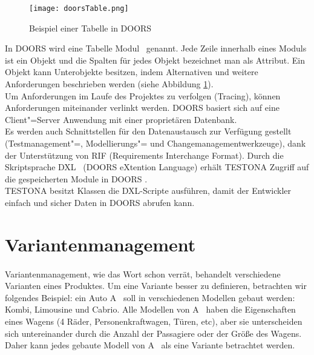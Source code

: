 \begin{figure}[h]
  \begin{center}
    \texttt{[image: doorsTable.png]}
  		  \caption{Beispiel einer Tabelle in DOORS}
     \label{doors.bespiel}
  \end{center}
\end{figure}


In DOORS wird eine Tabelle \glqq Modul\grqq~ genannt. Jede Zeile innerhalb eines Moduls  ist ein Objekt und die Spalten für jedes Objekt bezeichnet man als Attribut. Ein Objekt kann Unterobjekte besitzen, indem Alternativen und weitere Anforderungen beschrieben werden (siehe Abbildung \ref{doors.bespiel}).\\


Um Anforderungen im Laufe des Projektes zu verfolgen (Tracing), können Anforderungen miteinander verlinkt werden. DOORS basiert sich auf eine Client"=Server Anwendung mit einer proprietären Datenbank. \\


Es werden auch Schnittstellen für den Datenaustausch zur Verfügung gestellt (Testmanagement"=, Modellierungs"= und Changemanagementwerkzeuge), dank der Unterstützung von RIF (Requirements Interchange Format). Durch die Skriptsprache \glqq DXL\grqq~ (DOORS eXtention Language) erhält TESTONA Zugriff auf die gespeicherten Module in DOORS \cite{Doors} \cite{Anforderungsmanagement}.\\

TESTONA besitzt Klassen die DXL-Scripte ausführen, damit der Entwickler einfach und sicher Daten in DOORS abrufen kann.


\newpage
\section{Variantenmanagement}\label{sec:VarManag}
\paragraph{}

Variantenmanagement, wie das Wort schon verrät, behandelt verschiedene Varianten eines Produktes. Um eine Variante besser zu definieren, betrachten wir folgendes Beispiel: ein Auto \glqq A\grqq~ soll in verschiedenen Modellen gebaut werden: Kombi, Limousine und Cabrio. Alle Modellen von \glqq A\grqq~ haben die Eigenschaften eines Wagens (4 Räder, Personenkraftwagen, Türen, etc), aber sie unterscheiden sich untereinander durch die Anzahl der Passagiere oder der Größe des Wagens. Daher kann jedes gebaute Modell von \glqq A\grqq~ als eine Variante betrachtet werden.\\


